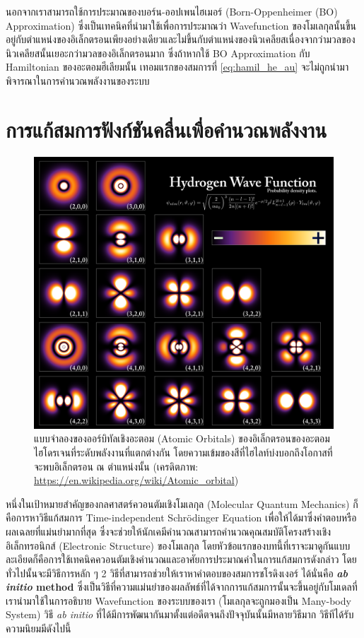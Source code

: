 นอกจากเราสามารถใช้การประมาณของบอร์น-ออปเพนไฮเมอร์ (Born-Oppenheimer (BO) Approximation) ซึ่งเป็นเทคนิคที่นำมาใช้เพื่อการประมาณว่า Wavefunction ของโมเลกุลนั้นขึ้นอยู่กับตำแหน่งของอิเล็กตรอนเพียงอย่างเดียวและไม่ขึ้นกับตำแหน่งของนิวเคลียสเนื่องจากว่ามวลของนิวเคลียสนั้นเยอะกว่ามวลของอิเล็กตรอนมาก ซึ่งถ้าหากใช้ BO Approximation กับ Hamiltonian ของอะตอมฮีเลียมนั้น เทอมแรกของสมการที่ \eqref{eq:hamil_he_au} จะไม่ถูกนำมาพิจารณาในการคำนวณพลังงานของระบบ

\section{การแก้สมการฟังก์ชันคลื่นเพื่อคำนวณพลังงาน}
\label{sec:wavefunc_ener}

\begin{figure}[H]
    \centering
    \includegraphics[width=0.7\linewidth]{fig/hydrogen_density_plots.png}
    \caption{แบบจำลองของออร์บิทัลเชิงอะตอม (Atomic Orbitals) ของอิเล็กตรอนของอะตอมไฮโดรเจนที่ระดับพลังงานที่แตกต่างกัน โดยความเข้มของสีที่ไฮไลท์บ่งบอกถึงโอกาสที่จะพบอิเล็กตรอน ณ ตำแหน่งนั้น (เครดิตภาพ: \url{https://en.wikipedia.org/wiki/Atomic_orbital})}
    \label{fig:hydrogen_density}
\end{figure}

หนึ่งในเป้าหมายสำคัญของกลศาสตร์ควอนตัมเชิงโมเลกุล (Molecular Quantum Mechanics) ก็คือการหาวิธีแก้สมการ Time-independent Schr\"{o}dinger Equation เพื่อให้ได้มาซึ่งคำตอบหรือผลเฉลยที่แม่นยำมากที่สุด ซึ่งจะช่วยให้นักเคมีคำนวณสามารถคำนวณคุณสมบัติโครงสร้างเชิงอิเล็กทรอนิกส์ (Electronic Structure) ของโมเลกุล โดยหัวข้อแรกของบทนี้ที่เราจะมาดูกันแบบละเอียดก็คือการใช้เทคนิคควอนตัมเชิงคำนวณและอาศัยการประมาณค่าในการแก้สมการดังกล่าว โดยทั่วไปนั้นจะมีวิธีการหลัก ๆ 2 วิธีที่สามารถช่วยให้เราหาคำตอบของสมการชโรดิงเงอร์ ได้นั่นคือ \textbf{\textit{ab initio} method} ซึ่งเป็นวิธีที่ความแม่นยำของผลลัพธ์ที่ได้จากการแก้สมการนั้นจะขึ้นอยู่กับโมเดลที่เรานำมาใช้ในการอธิบาย Wavefunction ของระบบของเรา (โมเลกุลจะถูกมองเป็น Many-body System) วิธี \textit{ab initio} ที่ได้มีการพัฒนากันมาตั้งแต่อดีตจนถึงปัจจุบันนั้นมีหลายวิธีมาก\autocite{friesner2005,helgaker2014,jensen2017} วิธีทีได้รับความนิยมมีดังไปนี้

